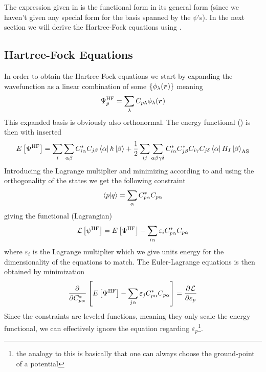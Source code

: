         The expression given in  is the functional form in
        its general form (since we haven't given any special form for the basis
        spanned by the $\psi$'s). In the next section we will derive the
        Hartree-Fock equations using .

    \subsection{Hartree-Fock Equations}
        In order to obtain the Hartree-Fock equations we start by expanding the
        wavefunction as a linear combination of some  $\{\phi_{\lambda}(\boldsymbol{{r}})\}$ meaning
            \begin{equation}
                \Psi^{\text{HF}}_p = \sum_{\lambda}
                C_{p\lambda}\phi_{\lambda}(\boldsymbol{{r}})
                \label{eq:psiexpand}
            \end{equation}
        This expanded basis is obviously also orthonormal. The energy
        functional () is then with 
        inserted
            \begin{equation}
                E\left[\Psi^{\text{HF}}\right] = \sum_i\sum_{\alpha\beta}
                C^*_{i\alpha}C_{j\beta}\bra{\alpha}h\ket{\beta} + \frac{1}{2}
                \sum_{ij} \sum_{\alpha\beta\gamma\delta}
                C^{*}_{i\alpha}C^{*}_{j\beta}C_{i\gamma}C_{j\delta}
                \bra{\alpha}H_{I}\ket{\beta}_{\text{AS}}
            \end{equation}
        Introducing the Lagrange multiplier and minimizing according to
         and using the orthogonality of the
        states we get the following constraint
            \begin{equation}
                \braket{p}{q} = \sum_{\alpha} C^{*}_{p\alpha}C_{p\alpha}
            \end{equation}
        giving the functional (Lagrangian)
            \begin{equation}
                \mathcal{L}\left[\psi^{\text{HF}}\right] = E\left[\Psi^{\text{HF}}\right] -
                \sum_{i\alpha} \varepsilon_iC^{*}_{p\alpha}C_{p\alpha}
            \end{equation}
        where $\varepsilon_i$ is the Lagrange multiplier which we give units
        energy for the dimensionality of the equations to match. The
        Euler-Lagrange equations is then obtained by minimization
            \begin{equation}
                \prd{C^{*}_{p\alpha}} \left[\EHF - \sum_{j\alpha}
                \varepsilon_jC^{*}_{p\alpha}C_{p\alpha}\right] =
                \prd{\varepsilon_p}[\mathcal{L}]
            \end{equation}
        Since the constraints are leveled functions, meaning they only scale
        the energy functional, we can effectively ignore the equation regarding
        $\varepsilon_p$\footnote{the analogy to this is basically that one can
        always choose the ground-point of a potential}.

